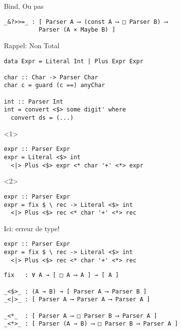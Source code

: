 \documentclass{beamer}
\begin{document}
\begin{frame}[fragile]{Bind, Ou pas}
\begin{verbatim}
_&?>>=_ : [ Parser A ⟶ (const A ⟶ □ Parser B) ⟶
          Parser (A × Maybe B) ]
\end{verbatim}
\end{frame}

\begin{frame}[fragile]{Rappel: Non Total}
\begin{verbatim}
data Expr = Literal Int | Plus Expr Expr

char :: Char -> Parser Char
char c = guard (c ==) anyChar

int :: Parser Int
int = convert <$> some digit' where
  convert ds = (...)
\end{verbatim}

\begin{onlyenv}<1>
\begin{mdframed}[backgroundcolor=lightgray]
\begin{verbatim}
expr :: Parser Expr
expr = Literal <$> int
  <|> Plus <$> expr <* char '+' <*> expr
\end{verbatim}
\end{mdframed}
\end{onlyenv}
\begin{onlyenv}<2>
\begin{mdframed}[backgroundcolor=lightgray]
\begin{verbatim}
expr :: Parser Expr
expr = fix $ \ rec -> Literal <$> int
  <|> Plus <$> rec <* char '+' <*> rec
\end{verbatim}
\end{mdframed}
\end{onlyenv}

\end{frame}

\begin{frame}[fragile]{Ici: erreur de type!}
\begin{mdframed}[backgroundcolor=lightgray]
\begin{verbatim}
expr :: Parser Expr
expr = fix $ \ rec -> Literal <$> int
  <|> Plus <$> rec <* char '+' <*> rec
\end{verbatim}
\end{mdframed}

\begin{verbatim}
fix   : ∀ A → [ □ A ⟶ A ] → [ A ]

_<$>_ : (A → B) → [ Parser A ⟶ Parser B ]
_<|>_ : [ Parser A ⟶ Parser A ⟶ Parser A ]

_<*_  : [ Parser A ⟶ □ Parser B ⟶ Parser A ]
_<*>_ : [ Parser (A → B) ⟶ □ Parser B ⟶ Parser A ]
\end{verbatim}
\end{frame}
\end{document}
